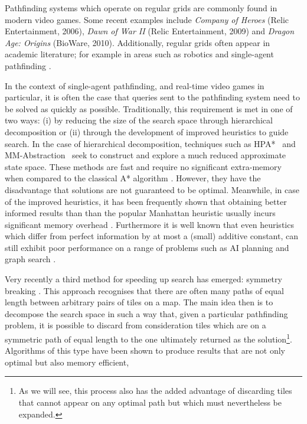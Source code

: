 Pathfinding systems which operate on regular grids are commonly found in modern video games.
Some recent examples include \emph{Company of Heroes} (Relic Entertainment, 2006), \emph{Dawn of War II} (Relic
Entertainment, 2009) and \emph{Dragon Age: Origins} (BioWare, 2010).
Additionally, regular grids often appear in academic literature; for example in areas such as robotics \cite{choset05} and
single-agent pathfinding \cite{botea04,bjornsson06,sturtevant07}.
\par
In the context of single-agent pathfinding, and real-time video games in particular, it is often the case that queries sent to
the pathfinding system  need to be solved as quickly as possible.
Traditionally, this requirement is met in one of two ways: (i) by reducing the size of the search space through hierarchical 
decomposition or (ii) through the development of improved heuristics to guide search.
In the case of hierarchical decomposition, techniques such as
HPA*~\cite{botea04} and MM-Abstraction~\cite{sturtevant07} seek to construct and explore
a much reduced approximate state space.
These methods are fast and require no significant extra-memory when compared to the classical
A* algorithm \cite{hart68}.
However, they have the disadvantage that solutions are not guaranteed to be optimal.
Meanwhile, in case of the improved heuristics, it has been frequently shown
that obtaining better informed results than than the popular
Manhattan heuristic usually incurs significant memory overhead 
\cite{sturtevant09,goldberg05,Cazenave:06,bjornsson06}.
Furthermore it is well known that even heuristics which differ from perfect information 
by at most a (small) additive constant, can still exhibit poor performance on a range of 
problems such as AI planning and graph search \cite{helmert08,pohl77}.
\par
Very recently a third method for speeding up search has emerged: symmetry
breaking \cite{bjornsson06,pochter10,harabor10}.
This approach recognises that there are often many paths of equal length between arbitrary pairs of tiles on a map.
The main idea then is to decompose the search space in such a way that, given a particular pathfinding problem, it is possible to
discard from consideration tiles which are on a symmetric path of equal length to the one ultimately returned 
as the solution\footnote{
As we will see, this process also has the added advantage of discarding tiles 
that cannot appear on any optimal path but which must nevertheless be expanded.}.
Algorithms of this type have been  shown to produce results that are not only optimal but also memory efficient, 
